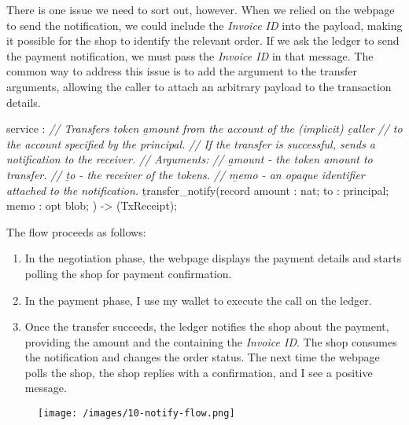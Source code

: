 \documentclass{article}
\begin{document}
There is one issue we need to sort out, however.
When we relied on the webpage to send the notification, we could include the \emph{Invoice ID} into the payload, making it possible for the shop to identify the relevant order.
If we ask the ledger to send the payment notification, we must pass the \emph{Invoice ID} in that message.
The common way to address this issue is to add the  argument to the transfer arguments, allowing the caller to attach an arbitrary payload to the transaction details.

\begin{code}[candid]
service : {
  \emph{// Transfers token \b{amount} from the account of the (implicit) \b{caller}}
  \emph{// to the account specified by the principal.}
  \emph{// If the transfer is successful, sends a notification to the receiver.}
  \emph{// Arguments:}
  \emph{//   \b{amount} - the token amount to transfer.}
  \emph{//   \b{to} - the receiver of the tokens.}
  \emph{//   \b{memo} - an opaque identifier attached to the notification.}
  \b{transfer_notify}(record {
    amount : nat;
    to : principal;
    memo : opt blob;
  }) -> (TxReceipt);
}
\end{code}

The flow proceeds as follows:
\begin{enumerate}
  \item In the negotiation phase, the webpage displays the payment details and starts polling the shop for payment confirmation.
  \item In the payment phase, I use my wallet to execute the  call on the ledger.
  \item 
    Once the transfer succeeds, the ledger notifies the shop about the payment, providing the amount and the  containing the \emph{Invoice ID}.
    The shop consumes the notification and changes the order status.
    The next time the webpage polls the shop, the shop replies with a confirmation, and I see a positive message.
\end{enumerate}

\begin{figure}[grayscale-diagram]
\texttt{[image: /images/10-notify-flow.png]}
\end{figure}
\end{document}
